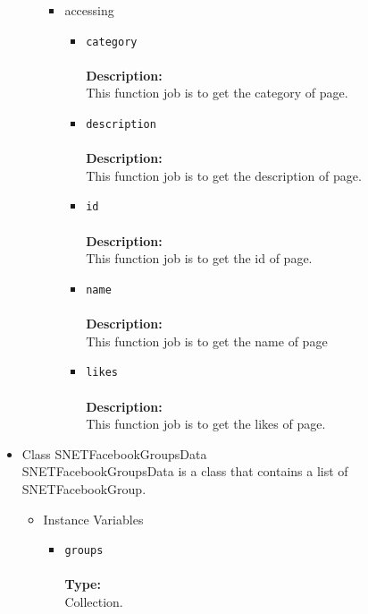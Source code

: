 \begin{itemize}
\begin{itemize}
\begin{itemize}
\item accessing
\label{sec-1-4-2-8-2-2}%
\begin{itemize}
\item \verb~category~\\\\
\textbf{Description:}\\
      This function job is to get the category of page.\\
\item \verb~description~\\\\
\textbf{Description:}\\
      This function job is to get the description of page.\\
\item \verb~id~\\\\
\textbf{Description:}\\
      This function job is to get the id of page.\\
\item \verb~name~\\\\
\textbf{Description:}\\
      This function job is to get the name of page\\
\item \verb~likes~\\\\
\textbf{Description:}\\
      This function job is to get the likes of page.
\end{itemize}

\end{itemize} %
\end{itemize} %

\item Class SNETFacebookGroupsData\\
\label{sec-1-4-2-9}%
SNETFacebookGroupsData is a class that contains a list of SNETFacebookGroup.

\begin{itemize}

\item Instance Variables
\label{sec-1-4-2-9-1}%
\begin{itemize}
\item \verb~groups~\\\\
\textbf{Type:}\\
     Collection.\\


\end{itemize}
\end{itemize}
\end{itemize}

